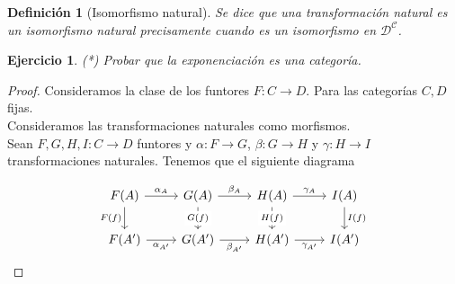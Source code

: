 \documentclass[12pt,letterpaper,titlepage]{article}
\newtheorem*{defn}{Definición}
\newtheorem{exe}{Ejercicio}
\theoremstyle{definition}
\newcommand\<{\langle}
\renewcommand\>{\rangle}
\begin{document}
    \begin{defn}[Isomorfismo natural]
        Se dice que una transformación natural es un isomorfismo natural precisamente cuando es un isomorfismo en $\mathcal{D^C}$.
    \end{defn}
    \begin{exe}%
    (*) Probar que la exponenciación es una categoría.
\end{exe}
\begin{proof}
  Consideramos la clase de los funtores $F\colon C\to D$. Para las categorías $C,D$ fijas.\\
Consideramos las transformaciones naturales como morfismos.\\
Sean $F,G,H,I:C\to D$ funtores y $\alpha\colon F\to G$, $\beta\colon G\to H$ y $\gamma\colon H\to I$ transformaciones naturales. Tenemos que el siguiente diagrama

\[
\begin{tikzcd}
F(A) \arrow[d, "F(f)"'] \arrow[r, "\alpha_A"] & G(A) \arrow[d, "G(f)" description] \arrow[r, "\beta_A"] & H(A) \arrow[d, "H(f)" description] \arrow[r, "\gamma_A"] & I(A) \arrow[d, "I(f)"] \\
F(A') \arrow[r, "\alpha_{A'}"']               & G(A') \arrow[r, "\beta_{A'}"']                          & H(A') \arrow[r, "\gamma_{A'}"']                          & I(A')                 
\end{tikzcd}
\]


\end{proof}
\end{document}
